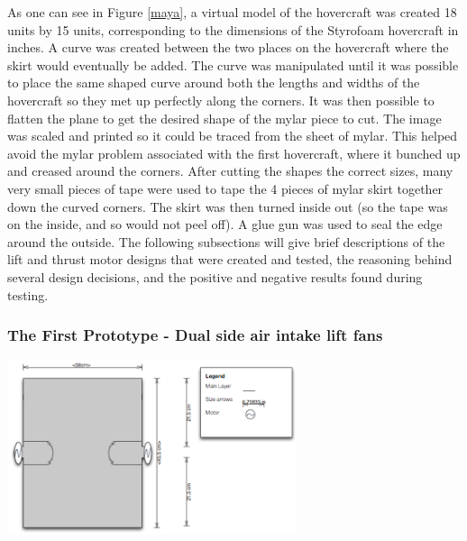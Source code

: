 As one can see in Figure \ref{maya}, a virtual model of the hovercraft was created 18 units by 15 units, corresponding
to the dimensions of the Styrofoam hovercraft in inches.  A curve was created between the two places on the hovercraft where the skirt would eventually be added.
The curve was manipulated until it was possible to place the same shaped curve around both the lengths and widths of the hovercraft
so they met up perfectly along the corners. It was then possible to flatten the plane to get the desired shape of the mylar piece 
to cut. The image was scaled and printed so it could be traced from the sheet of mylar. This helped avoid the mylar
problem associated with the first hovercraft, where it bunched up and creased around the corners. After cutting the shapes the correct sizes,  many very small pieces of tape were used to tape the 4 pieces of mylar skirt together down the curved corners.  The skirt was then turned inside out (so the tape was on the inside,
and so would not peel off).  A glue gun was used to seal the edge around the outside.  The following subsections will give
brief descriptions of the lift and thrust motor designs that were created and tested, the reasoning behind several design decisions, and the positive and negative results found during testing.

\subsubsection{The First Prototype - Dual side air intake lift fans}
\begin{center}
  \includegraphics[width=85mm]{imageSources/top2.png}
\end{center}
\label{top2}

